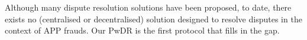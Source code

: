 


 

Although many dispute resolution solutions have been proposed, to date, there exists no  (centralised or decentralised) solution designed to resolve disputes in the context of APP frauds.  Our PwDR is the first protocol that fills in the gap. 

 




